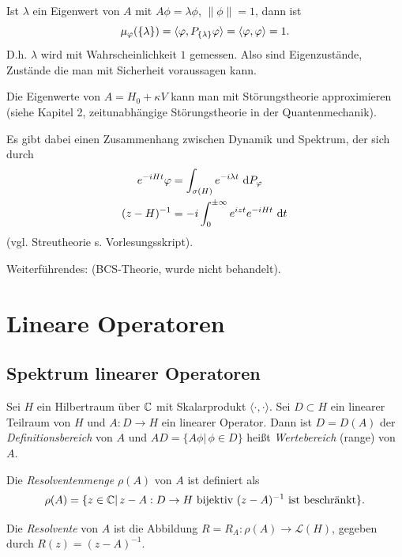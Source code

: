 \documentclass{mycourse}
\begin{document}
Ist $\lambda$ ein Eigenwert von $A$ mit $A\phi = \lambda \phi$, $\| \phi \|=1$, dann ist
\[
\mu_\phi(\{\lambda \}) = \< \phi, P_{\{\lambda\}} \phi \> = \< \phi, \phi \> =1.
\]
D.h. $\lambda$ wird mit Wahrscheinlichkeit $1$ gemessen. Also sind Eigenzustände, Zustände die man mit Sicherheit voraussagen kann.

Die Eigenwerte von $A= H_0 + \kappa V$ kann man mit Störungstheorie approximieren (siehe Kapitel 2, zeitunabhängige Störungstheorie in der Quantenmechanik).

Es gibt dabei einen Zusammenhang zwischen Dynamik und Spektrum, der sich durch
\begin{align*}
e^{-i Ht} \phi &= \int_{\sigma(H)} e^{-i\lambda t} \, \dx[P_\phi]\\
(z-H)^{-1}&= -i \int_0^{\pm \infty} e^{izt} e^{-iHt} \, \dx[t]
\end{align*}
(vgl. Streutheorie s. Vorlesungsskript).


Weiterführendes: (BCS-Theorie, wurde nicht behandelt).

\chapter{Lineare Operatoren}\label{1}
\section{Spektrum linearer Operatoren}
Sei $H$ ein Hilbertraum über $\C$ mit Skalarprodukt $\langle \cdot, \cdot \rangle$. Sei $D\subset H$ ein linearer Teilraum von $H$ und $A:D\to H$ ein linearer Operator. Dann ist $D=D(A)$ der \emph{Definitionsbereich} von $A$ und $AD=\{A\phi|\, \phi\in D\}$ heißt \emph{Wertebereich} (range) von $A$.

Die \emph{Resolventenmenge} $\rho(A)$ von $A$ ist definiert als 
\[
\rho(A)=\{z\in \C|\, z-A: D\to H \text{ bijektiv $(z-A)^{-1}$ ist beschränkt}\}.
\]

Die \emph{Resolvente} von $A$ ist die Abbildung $R=R_A: \rho(A) \to \mathcal L(H)$, gegeben durch $R(z)=(z-A)^{-1}$.
\end{document}
